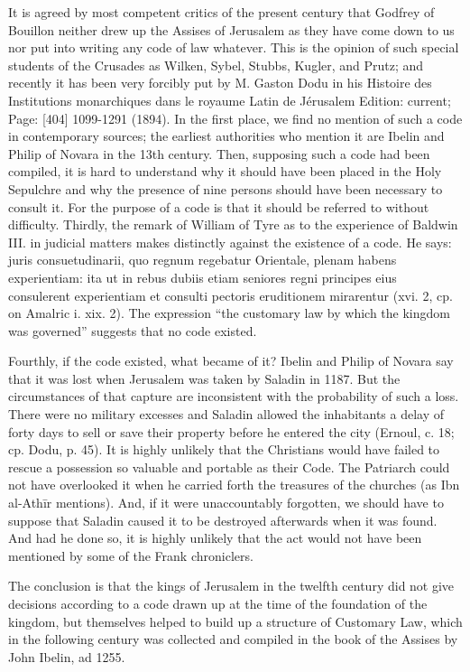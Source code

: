 
It is agreed by most competent critics of the present century that Godfrey of Bouillon neither drew up the Assises of Jerusalem as they have come down to us nor put into writing any code of law whatever. This is the opinion of such special students of the Crusades as Wilken, Sybel, Stubbs, Kugler, and Prutz; and recently it has been very forcibly put by M. Gaston Dodu in his Histoire des Institutions monarchiques dans le royaume Latin de Jérusalem Edition: current; Page: [404] 1099-1291 (1894). In the first place, we find no mention of such a code in contemporary sources; the earliest authorities who mention it are Ibelin and Philip of Novara in the 13th century. Then, supposing such a code had been compiled, it is hard to understand why it should have been placed in the Holy Sepulchre and why the presence of nine persons should have been necessary to consult it. For the purpose of a code is that it should be referred to without difficulty. Thirdly, the remark of William of Tyre as to the experience of Baldwin III. in judicial matters makes distinctly against the existence of a code. He says: juris consuetudinarii, quo regnum regebatur Orientale, plenam habens experientiam: ita ut in rebus dubiis etiam seniores regni principes eius consulerent experientiam et consulti pectoris eruditionem mirarentur (xvi. 2, cp. on Amalric i. xix. 2). The expression \texthebrew{“}the customary law by which the kingdom was governed\texthebrew{}” suggests that no code existed.

Fourthly, if the code existed, what became of it? Ibelin and Philip of Novara say that it was lost when Jerusalem was taken by Saladin in 1187. But the circumstances of that capture are inconsistent with the probability of such a loss. There were no military excesses and Saladin allowed the inhabitants a delay of forty days to sell or save their property before he entered the city (Ernoul, c. 18; cp. Dodu, p. 45). It is highly unlikely that the Christians would have failed to rescue a possession so valuable and portable as their Code. The Patriarch could not have overlooked it when he carried forth the treasures of the churches (as Ibn al-Athīr mentions). And, if it were unaccountably forgotten, we should have to suppose that Saladin caused it to be destroyed afterwards when it was found. And had he done so, it is highly unlikely that the act would not have been mentioned by some of the Frank chroniclers.

The conclusion is that the kings of Jerusalem in the twelfth century did not give decisions according to a code drawn up at the time of the foundation of the kingdom, but themselves helped to build up a structure of Customary Law, which in the following century was collected and compiled in the book of the Assises by John Ibelin, ad 1255.

